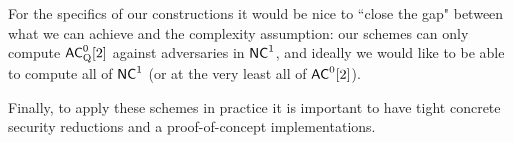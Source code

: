 For the specifics of our constructions it would be nice to ``close the gap" between what we can achieve and the complexity assumption: our schemes can only compute ${\mathsf{AC}}^0_{\text{Q}}[2]$ against adversaries in ${\mathsf{NC}}^1$, and ideally we would like to be able to compute all of ${\mathsf{NC}}^1$ (or at the very least all of ${\mathsf{AC}}^0[2]$). 

Finally, to apply these schemes in practice it is important to have tight concrete security reductions and a proof-of-concept implementations. 



%

